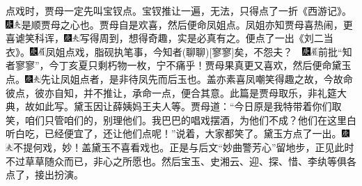 点戏时，贾母一定先叫宝钗点。宝钗推让一遍，无法，只得点了一折《西游记》。{\includegraphics[width=3mm]{../Images/00004}\includegraphics[width=3mm]{../Images/00012}\footnotesize \kaishu 是顺贾母之心也。}贾母自是欢喜，然后便命凤姐点。凤姐亦知贾母喜热闹，更喜谑笑科诨，{\includegraphics[width=3mm]{../Images/00004}\includegraphics[width=3mm]{../Images/00012}\footnotesize \kaishu 写得周到，想得奇趣，实是必真有之。}便点了一出《刘二当衣》。{{\includegraphics[width=3mm]{../Images/00004}\includegraphics[width=3mm]{../Images/00010}\footnotesize \kaishu 凤姐点戏，脂砚执笔事，今知者{(聊聊)}{[}寥寥{]}矣，不怨夫？　\includegraphics[width=3mm]{../Images/00004}\includegraphics[width=3mm]{../Images/00010}\footnotesize \kaishu 前批``知者寥寥''，今丁亥夏只剩朽物一枚，宁不痛乎！}}贾母果真更又喜欢，然后便命黛玉点。{\includegraphics[width=3mm]{../Images/00004}\includegraphics[width=3mm]{../Images/00012}\footnotesize \kaishu 先让凤姐点者，是非待凤先而后玉也。盖亦素喜凤嘲笑得趣之故，今故命彼点，彼亦自知，并不推让，承命一点，便合其意。此篇是贾母取乐，非礼筵大典，故如此写。}黛玉因让薛姨妈王夫人等。贾母道：``今日原是我特带着你们取笑，咱们只管咱们的，别理他们。我巴巴的唱戏摆酒，为他们不成？他们在这里白听白吃，已经便宜了，还让他们点呢！''说着，大家都笑了。黛玉方点了一出。{\includegraphics[width=3mm]{../Images/00004}\includegraphics[width=3mm]{../Images/00012}\footnotesize \kaishu 不提何戏，妙！盖黛玉不喜看戏也。正是与后文``妙曲警芳心''留地步，正见此时不过草草随众而已，非心之所愿也。}然后宝玉、史湘云、迎、探、惜、李纨等俱各点了，接出扮演。

